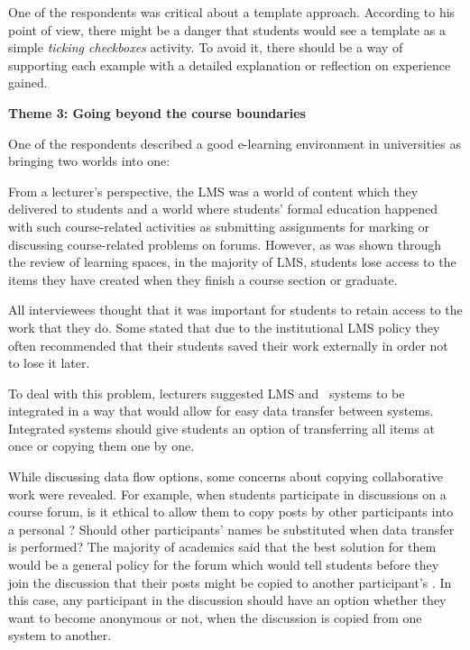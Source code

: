 One of the respondents was critical about a template approach. According to his
point of view, there might be a danger that students would see a template as a
simple \textit{ticking checkboxes} activity. To avoid it, there should be a way
of supporting each example with a detailed explanation or reflection on
experience gained.

\textbf{Theme 3: Going beyond the course boundaries}

One of the respondents described a good e-learning environment in universities
as bringing two worlds into one:


From a lecturer's perspective, the LMS was a world of content which they
delivered to students and a world where students' formal education happened with
such course-related activities as submitting assignments for marking or discussing
course-related problems on forums. However, as was shown through the review
of learning spaces, in the majority of LMS, students lose access to the items
they have created when they finish a course section or graduate.

All interviewees thought that it was important for students to retain access to
the work that they do. Some stated that due to the institutional LMS policy they
often recommended that their students saved their work externally in order not
to lose it later.

To deal with this problem, lecturers suggested LMS and \ep~systems to be
integrated in a way that would allow for easy data transfer between systems.
Integrated systems should give students an option of transferring all items at
once or copying them one by one.

While discussing data flow options, some concerns about copying collaborative
work were revealed. For example, when students participate in discussions on a
course forum, is it ethical to allow them to copy posts by other participants
into a personal \ep? Should other participants' names be substituted when
data transfer is performed? The majority of academics said that the best
solution for them would be a general policy for the forum which would tell
students before they join the discussion that their posts might be copied to
another participant's \ep. In this case, any participant in the discussion
should have an option whether they want to become anonymous or not, when the
discussion is copied from one system to another.

